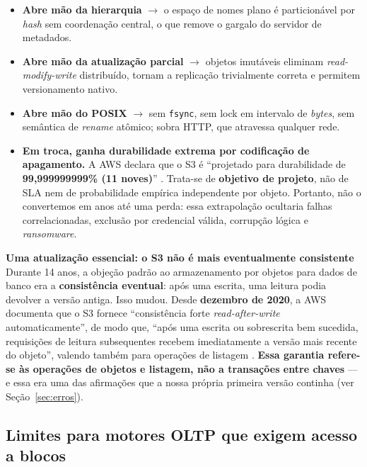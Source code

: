\documentclass[11pt,a4paper]{article}
\newcommand{\destaque}[2]{%
  \begin{center}\begin{minipage}{0.96\textwidth}
  \colorbox{fundo}{\begin{minipage}{\dimexpr\linewidth-2\fboxsep}
  \vspace{2pt}\textbf{\color{azul}\small #1}\\[1pt]\footnotesize #2\vspace{3pt}
  \end{minipage}}\end{minipage}\end{center}}
\begin{document}
\begin{itemize}[leftmargin=0.7cm,itemsep=3pt]
\item \textbf{Abre mão da hierarquia} $\rightarrow$ o espaço de nomes plano é particionável por
\textit{hash} sem coordenação central, o que remove o gargalo do servidor de metadados.
\item \textbf{Abre mão da atualização parcial} $\rightarrow$ objetos imutáveis eliminam
\textit{read-modify-write} distribuído, tornam a replicação trivialmente correta e permitem
versionamento nativo.
\item \textbf{Abre mão do POSIX} $\rightarrow$ sem \texttt{fsync}, sem lock em intervalo de
\textit{bytes}, sem semântica de \textit{rename} atômico; sobra HTTP, que atravessa qualquer rede.
\item \textbf{Em troca, ganha durabilidade extrema por codificação de apagamento.} A AWS declara
que o S3 é ``projetado para durabilidade de \textbf{99,999999999\% (11 noves)}''
\cite{awss3faq}. Trata-se de \textbf{objetivo de projeto}, não de SLA nem de probabilidade
empírica independente por objeto. Portanto, não o convertemos em anos até uma perda:
essa extrapolação ocultaria falhas correlacionadas, exclusão por credencial válida,
corrupção lógica e \textit{ransomware}.
\end{itemize}

\destaque{Uma atualização essencial: o S3 não é mais eventualmente consistente}{%
Durante 14 anos, a objeção padrão ao armazenamento por objetos para dados de banco era a
\textbf{consistência eventual}: após uma escrita, uma leitura podia devolver a versão antiga. Isso
mudou. Desde \textbf{dezembro de 2020}, a AWS documenta que o S3 fornece ``consistência forte
\textit{read-after-write} automaticamente'', de modo que, ``após uma escrita ou sobrescrita bem
sucedida, requisições de leitura subsequentes recebem imediatamente a versão mais recente do
objeto'', valendo também para operações de listagem \cite{awss3faq}. \textbf{Essa garantia refere-se às operações de objetos e listagem, não a transações entre chaves} --- e
essa era uma das afirmações que a nossa própria primeira versão continha (ver
Seção~\ref{sec:erros}).}

\subsection{Limites para motores OLTP que exigem acesso a blocos}
\end{document}

